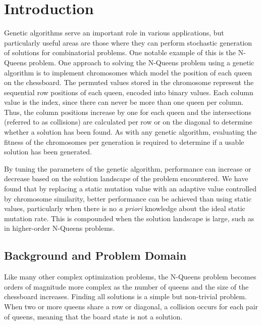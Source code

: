 \documentclass{sig-alternate}
\begin{document}




% 
%
\section{Introduction}
Genetic algorithms serve an important role in various applications, but particularly useful areas are those where they can perform stochastic generation of solutions for combinatorial problems. One notable example of this is the N-Queens problem. One approach to solving the N-Queens problem using a genetic algorithm is to implement chromosomes which model the position of each queen on the chessboard. The permuted values stored in the chromosome represent the sequential row positions of each queen, encoded into binary values. Each column value is the index, since there can never be more than one queen per column. Thus, the column positions increase by one for each queen and the intersections (referred to as collisions) are calculated per row or on the diagonal to determine whether a solution has been found. As with any genetic algorithm, evaluating the fitness of the chromosomes per generation is required to determine if a usable solution has been generated. 

By tuning the parameters of the genetic algorithm, performance can increase or decrease based on the solution landscape of the problem encountered. We have found that by replacing a static mutation value with an adaptive value controlled by chromosome similarity, better performance can be achieved than using static values, particularly when there is no \emph{a priori} knowledge about the ideal static mutation rate. This is compounded when the solution landscape is large, such as in higher-order N-Queens problems.

\subsection{Background and Problem Domain}
Like many other complex optimization problems, the N-Queens problem becomes orders of magnitude more complex as the number of queens and the size of the chessboard increases. Finding all solutions is a simple but non-trivial problem. When two or more queens share a row or diagonal, a collision occurs for each pair of queens, meaning that the board state is not a solution.
\end{document}
